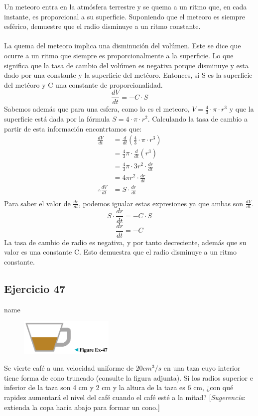 \documentclass[12pt]{article}
\begin{document}
Un meteoro entra en la atmósfera terrestre y se quema a un ritmo que, en cada instante, es proporcional a su superficie. Suponiendo que el meteoro es siempre esférico, demuestre que el radio disminuye a un ritmo constante.\\ \\
La quema del meteoro implica una disminución del volúmen. Este se dice que ocurre a un ritmo que siempre es proporcionalmente a la superficie. Lo que significa que la tasa de cambio del volúmen es negativa porque disminuye y esta dado por una constante y la superficie del metéoro. Entonces, si S es la superficie del metéoro y C una constante de proporcionalidad.
\[
\frac{dV}{dt} = -C \cdot S
\]
Sabemos además que para una esfera, como lo es el meteoro, $V= \frac{4}{3}\cdot \pi \cdot r^{3}$ y que la superficie está dada por la fórmula $S=4 \cdot \pi \cdot r^{2}$.
Calculando la tasa de cambio a partir de esta información encontrtamos que:
\begin{equation*}
  \begin{split}
  \frac{dV}{dt} 
  &= \frac{d}{dt} (\frac{4}{3}\cdot \pi \cdot r^{3})\\
  &= \frac{4}{3} \pi \cdot  \frac{d}{dt} (r^{3})\\
  &= \frac{4}{3} \pi \cdot  3r^{2} \cdot \frac{dr}{dt}\\
  &= 4  \pi r^{2} \cdot \frac{dr}{dt}\\
  \therefore
   \frac{dV}{dt}
     &= S  \cdot \frac{dr}{dt} \\
  \end{split}
\end{equation*}
Para saber el valor de $\frac{dr}{dt}$, podemos igualar estas expresiones ya que ambas son $  \frac{dV}{dt}$.
\[
 S  \cdot \frac{dr}{dt} =  -C \cdot S  
 \]
 \[
  \frac{dr}{dt} =  -C  
  \]
La tasa de cambio de radio es negativa, y por tanto decreciente, además que su valor es una constante C. Esto demuestra que el radio disminuye a un ritmo constante. 

\subsection{Ejercicio 47} name \\

\begin{figure}[H]
\centering
\includegraphics[width=0.4\textwidth]{../img/img_Lista3/47.png}
\end{figure}
Se vierte café a una velocidad uniforme de $20 cm^3/s$ en una taza cuyo interior tiene forma de cono truncado (consulte la figura adjunta). Si los radios superior e inferior de la taza son 4 cm y 2 cm y la altura de la taza es 6 cm, ¿con qué rapidez aumentará el nivel del café cuando el café esté a la mitad? [\textit{Sugerencia}: extienda la copa hacia abajo para formar un cono.]
\end{document}
